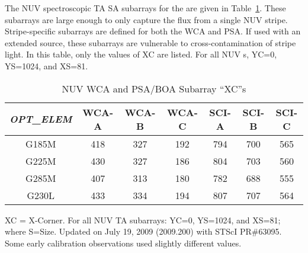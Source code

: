 The NUV spectroscopic TA SA subarrays for the  are given in Table~\ref{tab:NUVspSUBSxd}.
These subarrays are large enough to only capture the flux from a single NUV stripe.
Stripe-specific subarrays are defined for both the WCA and PSA.
If used with an extended source, these subarrays are vulnerable to cross-contamination of stripe light. In this table, only the values of XC are listed.
For all NUV s, YC=0, YS=1024, and XS=81.

\begin{table}
\centering
	\begin{threeparttable}[tbc]
		\caption{NUV  WCA and PSA/BOA Subarray ``XC''s}
			\begin{tabular*}{.75\linewidth}{@{\extracolsep{\fill}}ccccccc}
			\\
			\hline
			\textit{OPT\_ELEM}&WCA-A & WCA-B &WCA-C &SCI-A&SCI-B&SCI-C\\
			\hline
			G185M	&	418	&	327	&	192	&	794	&	700	&	565	\\
			G225M	&	430	&	327	&	186	&	804	&	703	&	560	\\
			G285M	&	407	&	313	&	180	&	782	&	688	&	555	\\
			G230L	&	433	&	334	&	194	&	807	&	707	&	564 \\
			\hline
		\end{tabular*}
		\footnotesize
			\begin{tablenotes}
				\item[1] XC = X-Corner. For all NUV  TA subarrays: YC=0, YS=1024, and XS=81; where S=Size. Updated on July 19, 2009 (2009.200) with STScI PR\#63095. Some early calibration observations used slightly different values.
			\end{tablenotes}
			\label{tab:NUVspSUBSxd}
		\normalsize
	\end{threeparttable}
\end{table}
